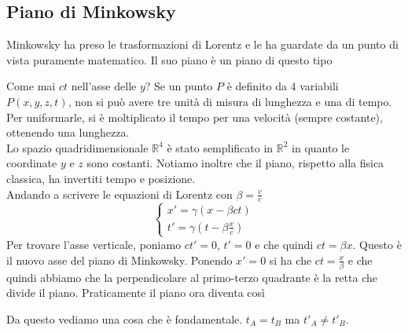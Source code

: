 \subsection{Piano di Minkowsky}
Minkowsky ha preso le trasformazioni di Lorentz e le ha guardate da un punto di vista puramente
matematico. Il suo piano è un piano di questo tipo
\begin{center}
\end{center}
Come mai $ct$ nell'asse delle $y$? Se un punto $P$ è definito da 4 variabili $P(x,y,z,t)$, non si
può avere tre unità di misura di lunghezza e una di tempo. Per uniformarle, si è moltiplicato il
tempo per una velocità (sempre costante), ottenendo una lunghezza.\\
Lo spazio quadridimensionale $\mathbb{R}^4$ è stato semplificato in $\mathbb{R}^2$ in quanto le
coordinate $y$ e $z$ sono costanti. Notiamo inoltre che il piano, rispetto alla fisica classica, 
ha invertiti tempo e posizione.\\ [\baselineskip]
Andando a scrivere le equazioni di Lorentz con $\beta = \frac{v}{c}$
\begin{equation*}
  \begin{cases}
    x' =\gamma(x-\beta ct)\\
    t'=\gamma\left(t-\beta\frac{x}{c}\right)
  \end{cases}
\end{equation*}
Per trovare l'asse verticale, poniamo $ct'=0$, $t'=0$ e che quindi $ct = \beta x$. Questo è il 
nuovo asse del piano di Minkowsky. Ponendo $x'=0$ si ha che $ct=\frac{x}{\beta}$ e che quindi 
abbiamo che la perpendicolare al primo-terzo quadrante è la retta che divide il piano. Praticamente
il piano ora diventa così
\begin{center}
\end{center}
Da questo vediamo una cosa che è fondamentale. $t_A=t_B$ ma $t'_A\neq t'_B$.

